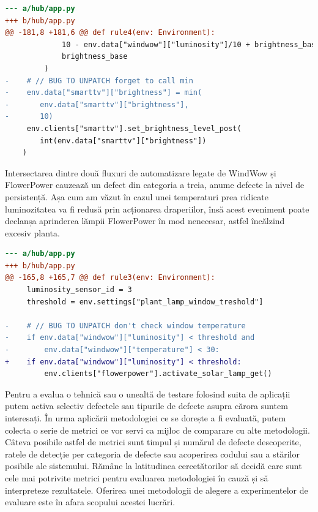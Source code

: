 \begin{lstlisting}[language=diff, caption={Valorile luminozității transmise spre SmartTV nu sunt doar în intervalul (1, 10)}]
--- a/hub/app.py
+++ b/hub/app.py
@@ -181,8 +181,6 @@ def rule4(env: Environment):
             10 - env.data["windwow"]["luminosity"]/10 + brightness_base,
             brightness_base 
         )
-    # // BUG TO UNPATCH forget to call min
-    env.data["smarttv"]["brightness"] = min(
-       env.data["smarttv"]["brightness"], 
-       10)
     env.clients["smarttv"].set_brightness_level_post(
        int(env.data["smarttv"]["brightness"])
    )
\end{lstlisting}

Intersectarea dintre două fluxuri de automatizare legate de WindWow și FlowerPower cauzează un defect din categoria a treia, anume defecte la nivel de persistență. Așa cum am văzut în cazul unei temperaturi prea ridicate luminozitatea va fi redusă prin acționarea draperiilor, însă acest eveniment poate declanșa aprinderea lămpii FlowerPower în mod nenecesar, astfel încălzind excesiv planta. 

\begin{lstlisting}[language=diff, caption={Lipsa verificării temperaturii cauzează un conflict între două fluxuri de automatizare}]
--- a/hub/app.py
+++ b/hub/app.py
@@ -165,8 +165,7 @@ def rule3(env: Environment):
     luminosity_sensor_id = 3
     threshold = env.settings["plant_lamp_window_treshold"]
 
-    # // BUG TO UNPATCH don't check window temperature
-    if env.data["windwow"]["luminosity"] < threshold and 
-        env.data["windwow"]["temperature"] < 30:
+    if env.data["windwow"]["luminosity"] < threshold:
         env.clients["flowerpower"].activate_solar_lamp_get()
\end{lstlisting}

Pentru a evalua o tehnică sau o unealtă de testare folosind suita de aplicații putem activa selectiv defectele sau tipurile de defecte asupra cărora suntem interesați. În urma aplicării metodologiei ce se dorește a fi evaluată, putem colecta o serie de metrici ce vor servi ca mijloc de comparare cu alte metodologii. Câteva posibile astfel de metrici sunt timpul și numărul de defecte descoperite, ratele de detecție per categoria de defecte sau acoperirea codului sau a stărilor posibile ale sistemului. Rămâne la latitudinea cercetătorilor să decidă care sunt cele mai potrivite metrici pentru evaluarea metodologiei în cauză și să interpreteze rezultatele. Oferirea unei metodologii de alegere a experimentelor de evaluare este în afara scopului acestei lucrări.

